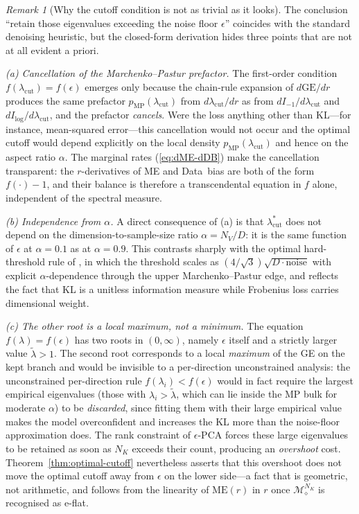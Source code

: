 \documentclass[11pt,a4paper]{article}
\theoremstyle{definition}
\theoremstyle{remark}
\newtheorem*{remark}{Remark}
\newcommand{\NK}{N_K}
\newcommand{\NV}{N_V}
\newcommand{\Mfam}{\mathcal{M}}
\begin{document}
\begin{remark}[Why the cutoff condition is not as trivial as it looks]
\label{rem:not-trivial}
The conclusion ``retain those eigenvalues exceeding the noise
floor $\epsilon$'' coincides with the standard denoising
heuristic, but the closed-form derivation hides three points
that are not at all evident a priori.

\emph{(a) Cancellation of the Marchenko--Pastur prefactor.}
The first-order condition $f(\lambda_{\mathrm{cut}}) = f(\epsilon)$
emerges only because the chain-rule expansion of
$d\mathrm{GE}/dr$ produces the same prefactor
$p_{\mathrm{MP}}(\lambda_{\mathrm{cut}})$ from
$d\lambda_{\mathrm{cut}}/dr$ as from $dI_{-1}/d\lambda_{\mathrm{cut}}$
and $dI_{\log}/d\lambda_{\mathrm{cut}}$, and the prefactor
\emph{cancels}. Were the loss anything other than KL---for
instance, mean-squared error---this cancellation would not occur
and the optimal cutoff would depend explicitly on the local
density $p_{\mathrm{MP}}(\lambda_{\mathrm{cut}})$ and hence on
the aspect ratio $\alpha$. The marginal rates
(\ref{eq:dME-dDB}) make the cancellation transparent: the
$r$-derivatives of ME and Data~bias are both of the form
$f(\cdot) - 1$, and their balance is therefore a transcendental
equation in $f$ alone, independent of the spectral measure.

\emph{(b) Independence from $\alpha$.}
A direct consequence of (a) is that
$\lambda_{\mathrm{cut}}^{*}$ does not depend on the
dimension-to-sample-size ratio $\alpha = \NV/D$: it is the same
function of $\epsilon$ at $\alpha = 0.1$ as at $\alpha = 0.9$.
This contrasts sharply with the optimal hard-threshold rule of
\cite{GavishDonoho2014}, in which the threshold scales as
$(4/\sqrt{3})\sqrt{D \cdot \mathrm{noise}}$ with explicit
$\alpha$-dependence through the upper Marchenko--Pastur edge,
and reflects the fact that KL is a unitless information measure
while Frobenius loss carries dimensional weight.

\emph{(c) The other root is a local maximum, not a minimum.}
The equation $f(\lambda) = f(\epsilon)$ has two roots in
$(0,\infty)$, namely $\epsilon$ itself and a strictly larger
value $\widetilde{\lambda} > 1$. The second root corresponds to
a local \emph{maximum} of the GE on the kept branch and would
be invisible to a per-direction unconstrained analysis: the
unconstrained per-direction rule
$f(\lambda_i) < f(\epsilon)$ would in fact require the largest
empirical eigenvalues (those with $\lambda_i > \widetilde{\lambda}$,
which can lie inside the MP bulk for moderate $\alpha$) to be
\emph{discarded}, since fitting them with their large empirical
value makes the model overconfident and increases the KL more
than the noise-floor approximation does. The rank constraint of
$\epsilon$-PCA forces these large eigenvalues to be retained as
soon as $\NK$ exceeds their count, producing an
\emph{overshoot} cost. Theorem~\ref{thm:optimal-cutoff}
nevertheless asserts that this overshoot does not move the
optimal cutoff away from $\epsilon$ on the lower side---a fact
that is geometric, not arithmetic, and follows from the
linearity of $\mathrm{ME}(r)$ in $r$ once $\Mfam_{\diamond}^{\NK}$
is recognised as e-flat.
\end{remark}
\end{document}
